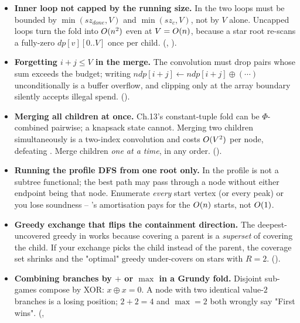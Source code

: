 \begin{itemize}[nosep, leftmargin=1.4em]
  \item \textbf{Inner loop not capped by the running size.} In
         the two loops must be bounded by
        $\min(\mathit{sz}_{\mathit{done}}, V)$ and $\min(\mathit{sz}_c, V)$,
        not by $V$ alone. Uncapped loops turn the fold into $O(n^2)$ even
        at $V = O(n)$, because a star root re-scans a fully-zero
        $\mathit{dp}[v][0..V]$ once per child. (,
        ).
  \item \textbf{Forgetting $i + j \le V$ in the merge.} The convolution must
        drop pairs whose sum exceeds the budget; writing
        $\mathit{ndp}[i+j] \leftarrow \mathit{ndp}[i+j] \oplus (\cdots)$
        unconditionally is a buffer overflow, and clipping only at the array
        boundary silently accepts illegal spend. ().
  \item \textbf{Merging all children at once.} Ch.13's constant-tuple fold
        can be $\Phi$-combined pairwise; a knapsack state cannot. Merging
        two children simultaneously is a two-index convolution and costs
        $O(V^2)$ per node, defeating . Merge
        children \emph{one at a time}, in any order. ().
  \item \textbf{Running the profile DFS from one root only.} In
         the profile is not a subtree functional; the
        best path may pass through a node without either endpoint being that
        node. Enumerate \emph{every} start vertex (or every peak) or you lose
        soundness -- 's amortisation pays for the
        $O(n)$ starts, not $O(1)$.
  \item \textbf{Greedy exchange that flips the containment direction.} The
        deepest-uncovered greedy in  works because
        covering a parent is a \emph{superset} of covering the child. If your
        exchange picks the child instead of the parent, the coverage set
        shrinks and the "optimal" greedy under-covers on stars with $R=2$.
        ().
  \item \textbf{Combining branches by $+$ or $\max$ in a Grundy fold.}
        Disjoint sub-games compose by XOR: $x \oplus x = 0$. A node with two
        identical value-$2$ branches is a losing position; $2+2 = 4$ and
        $\max = 2$ both wrongly say "First wins". (,

\end{itemize}
